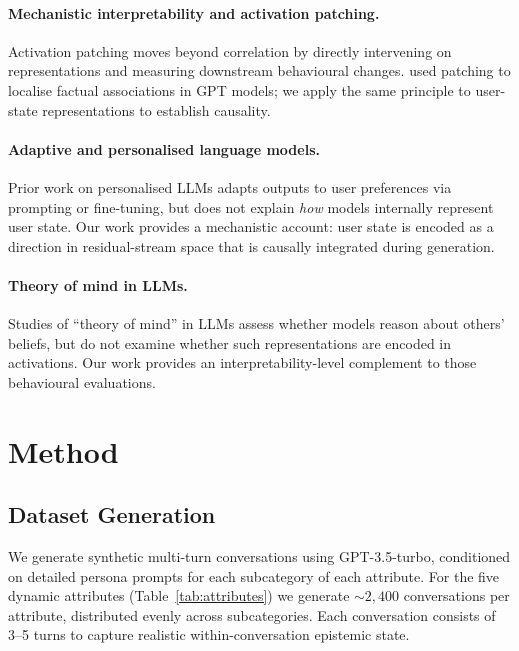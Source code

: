 \documentclass[11pt]{article}
\begin{document}
\paragraph{Mechanistic interpretability and activation patching.}
Activation patching \citep{meng2022locating,geiger2021causal} moves beyond
correlation by directly intervening on representations and measuring downstream
behavioural changes.  \citet{meng2022locating} used patching to localise
factual associations in GPT models; we apply the same principle to user-state
representations to establish causality.

\paragraph{Adaptive and personalised language models.}
Prior work on personalised LLMs \citep{salemi2023lamp} adapts outputs to
user preferences via prompting or fine-tuning, but does not explain
\emph{how} models internally represent user state.  Our work provides a
mechanistic account: user state is encoded as a direction in residual-stream
space that is causally integrated during generation.

\paragraph{Theory of mind in LLMs.}
Studies of ``theory of mind'' in LLMs \citep{kosinski2023theory,ullman2023large}
assess whether models reason about others' beliefs, but do not examine whether
such representations are encoded in activations.  Our work provides an
interpretability-level complement to those behavioural evaluations.

\section{Method}

\subsection{Dataset Generation}

We generate synthetic multi-turn conversations using GPT-3.5-turbo, conditioned
on detailed persona prompts for each subcategory of each attribute.  For the
five dynamic attributes (Table~\ref{tab:attributes}) we generate
${\sim}2{,}400$ conversations per attribute, distributed evenly across
subcategories.  Each conversation consists of 3--5 turns to capture realistic
within-conversation epistemic state.
\end{document}
